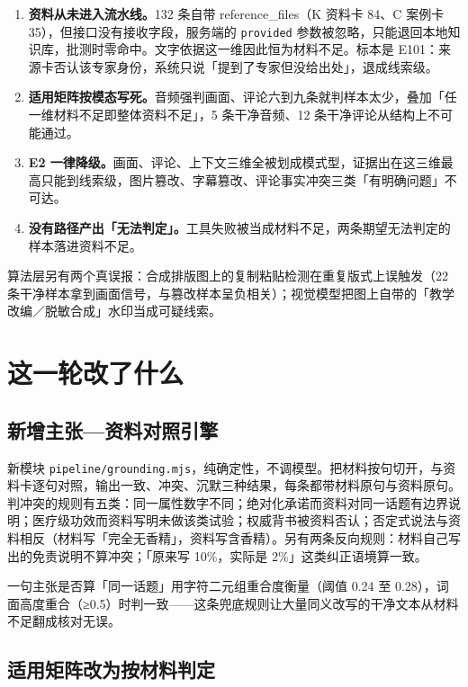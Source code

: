 \documentclass[11pt]{ctexart}
\begin{document}
\begin{enumerate}
\item \textbf{资料从未进入流水线。}132 条自带 reference\_files（K 资料卡 84、C 案例卡 35），但接口没有接收字段，服务端的 \texttt{provided} 参数被忽略，只能退回本地知识库，批测时零命中。文字依据这一维因此恒为材料不足。标本是 E101：来源卡否认该专家身份，系统只说「提到了专家但没给出处」，退成线索级。
\item \textbf{适用矩阵按模态写死。}音频强判画面、评论六到九条就判样本太少，叠加「任一维材料不足即整体资料不足」，5 条干净音频、12 条干净评论从结构上不可能通过。
\item \textbf{E2 一律降级。}画面、评论、上下文三维全被划成模式型，证据出在这三维最高只能到线索级，图片篡改、字幕篡改、评论事实冲突三类「有明确问题」不可达。
\item \textbf{没有路径产出「无法判定」。}工具失败被当成材料不足，两条期望无法判定的样本落进资料不足。
\end{enumerate}

算法层另有两个真误报：合成排版图上的复制粘贴检测在重复版式上误触发（22 条干净样本拿到画面信号，与篡改样本呈负相关）；视觉模型把图上自带的「教学改编／脱敏合成」水印当成可疑线索。

\section{这一轮改了什么}

\subsection{新增主张—资料对照引擎}

新模块 \texttt{pipeline/grounding.mjs}，纯确定性，不调模型。把材料按句切开，与资料卡逐句对照，输出一致、冲突、沉默三种结果，每条都带材料原句与资料原句。判冲突的规则有五类：同一属性数字不同；绝对化承诺而资料对同一话题有边界说明；医疗级功效而资料写明未做该类试验；权威背书被资料否认；否定式说法与资料相反（材料写「完全无香精」，资料写含香精）。另有两条反向规则：材料自己写出的免责说明不算冲突；「原来写 10\%，实际是 2\%」这类纠正语境算一致。

一句主张是否算「同一话题」用字符二元组重合度衡量（阈值 0.24 至 0.28），词面高度重合（≥0.5）时判一致——这条兜底规则让大量同义改写的干净文本从材料不足翻成核对无误。

\subsection{适用矩阵改为按材料判定}
\end{document}
